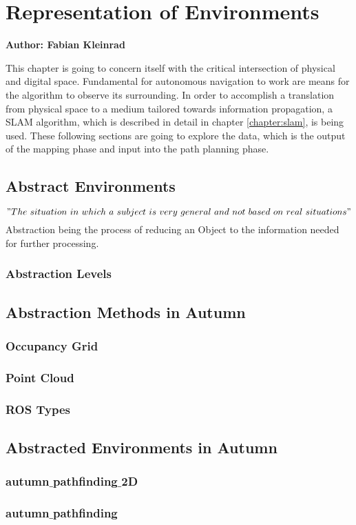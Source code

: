 \chapter{Representation of Environments}

\textbf{Author: Fabian Kleinrad} 

This chapter is going to concern itself with the critical intersection of physical and digital space. Fundamental for autonomous navigation to work are means for the algorithm to observe its surrounding. In order to accomplish a translation from physical space to a medium tailored towards information propagation, a SLAM algorithm, which is described in detail in chapter \ref{chapter:slam}, is being used. These following sections are going to explore the data, which is the output of the mapping phase and input into the path planning phase.

\section{Abstract Environments}

\["The\ situation\ in\ which\ a\ subject\ is\ very\ general \ and\ not\ based\ on\ real\ situations"\]
Abstraction being the process of reducing an Object to the information needed for further processing. 

\subsection{Abstraction Levels}

\section{Abstraction Methods in Autumn}

\subsection{Occupancy Grid}

\subsection{Point Cloud}

\subsection{ROS Types}

\section{Abstracted Environments in Autumn}

\subsection{autumn$\_$pathfinding$\_$2D}

\subsection{autumn$\_$pathfinding}